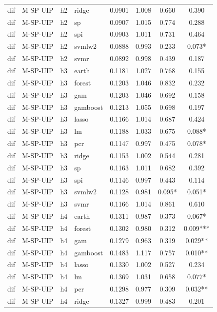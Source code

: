 \begin{ThreePartTable}
\begin{longtable}[t]{llclcccc}
dif & M-SP-UIP & h2 & ridge & 0.0901 & 1.008 & 0.660 & 0.390\\
dif & M-SP-UIP & h2 & sp & 0.0907 & 1.015 & 0.774 & 0.288\\
dif & M-SP-UIP & h2 & spi & 0.0903 & 1.011 & 0.731 & 0.464\\
dif & M-SP-UIP & h2 & svmlw2 & 0.0888 & 0.993 & 0.233 & 0.073*\\
dif & M-SP-UIP & h2 & svmr & 0.0892 & 0.998 & 0.439 & 0.187\\
\addlinespace
dif & M-SP-UIP & h3 & earth & 0.1181 & 1.027 & 0.768 & 0.155\\
dif & M-SP-UIP & h3 & forest & 0.1203 & 1.046 & 0.832 & 0.232\\
dif & M-SP-UIP & h3 & gam & 0.1203 & 1.046 & 0.692 & 0.158\\
dif & M-SP-UIP & h3 & gamboost & 0.1213 & 1.055 & 0.698 & 0.197\\
dif & M-SP-UIP & h3 & lasso & 0.1166 & 1.014 & 0.687 & 0.424\\
dif & M-SP-UIP & h3 & lm & 0.1188 & 1.033 & 0.675 & 0.088*\\
dif & M-SP-UIP & h3 & pcr & 0.1147 & 0.997 & 0.475 & 0.078*\\
dif & M-SP-UIP & h3 & ridge & 0.1153 & 1.002 & 0.544 & 0.281\\
dif & M-SP-UIP & h3 & sp & 0.1163 & 1.011 & 0.682 & 0.392\\
dif & M-SP-UIP & h3 & spi & 0.1146 & 0.997 & 0.443 & 0.114\\
dif & M-SP-UIP & h3 & svmlw2 & 0.1128 & 0.981 & 0.095* & 0.051*\\
dif & M-SP-UIP & h3 & svmr & 0.1166 & 1.014 & 0.861 & 0.610\\
\addlinespace
dif & M-SP-UIP & h4 & earth & 0.1311 & 0.987 & 0.373 & 0.067*\\
dif & M-SP-UIP & h4 & forest & 0.1302 & 0.980 & 0.312 & 0.009***\\
dif & M-SP-UIP & h4 & gam & 0.1279 & 0.963 & 0.319 & 0.029**\\
dif & M-SP-UIP & h4 & gamboost & 0.1483 & 1.117 & 0.757 & 0.010**\\
dif & M-SP-UIP & h4 & lasso & 0.1330 & 1.002 & 0.527 & 0.234\\
dif & M-SP-UIP & h4 & lm & 0.1369 & 1.031 & 0.658 & 0.077*\\
dif & M-SP-UIP & h4 & pcr & 0.1298 & 0.977 & 0.309 & 0.032**\\
dif & M-SP-UIP & h4 & ridge & 0.1327 & 0.999 & 0.483 & 0.201\\

\end{longtable}
\end{ThreePartTable}
